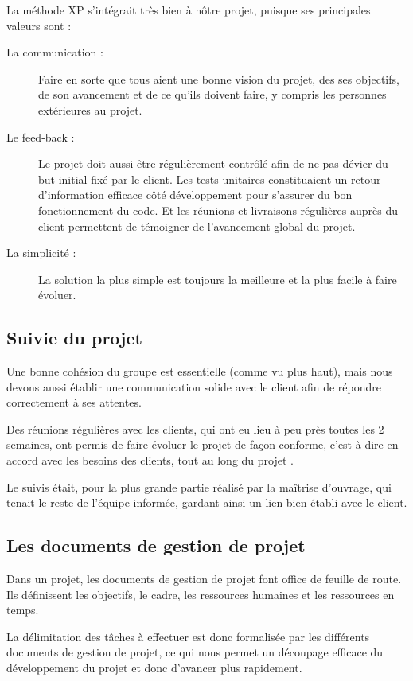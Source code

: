     La méthode XP s'intégrait très bien à nôtre projet, puisque ses principales
    valeurs sont :
    \begin{description}
      \item[La communication :] Faire en sorte que tous aient une bonne vision
      du projet, des ses objectifs, de son avancement et de ce qu'ils doivent
      faire, y compris les personnes extérieures au projet.
      \item[Le feed-back :] Le projet doit aussi être régulièrement contrôlé
      afin de ne pas dévier du but initial fixé par le client. Les tests
      unitaires constituaient un retour d'information efficace côté
      développement pour s'assurer du bon fonctionnement du code. Et les
      réunions et livraisons régulières auprès du client permettent de
      témoigner de l'avancement global du projet.
      \item[La simplicité :] La solution la plus simple est toujours la
      meilleure et la plus facile à faire évoluer.
    \end{description}


  \subsection{Suivie du projet}

    Une bonne cohésion du groupe est essentielle (comme vu plus haut), mais
    nous devons aussi établir une communication solide avec le client afin de
    répondre correctement à ses attentes.

    Des réunions régulières avec les clients, qui ont eu lieu à peu près toutes
    les 2 semaines, ont permis de faire évoluer le projet de façon conforme,
    c'est-à-dire en accord avec les besoins des clients, tout au long du projet
    .

    Le suivis était, pour la plus grande partie réalisé par la maîtrise
    d'ouvrage, qui tenait le reste de l'équipe informée, gardant ainsi un lien
    bien établi avec le client.


  \subsection{Les documents de gestion de projet}

    Dans un projet, les documents de gestion de projet font office de feuille
    de route. Ils définissent les objectifs, le cadre, les ressources humaines
    et les ressources en temps.

    La délimitation des tâches à effectuer est donc formalisée par les
    différents documents de gestion de projet, ce qui nous permet un découpage
    efficace du développement du projet et donc d'avancer plus rapidement.

